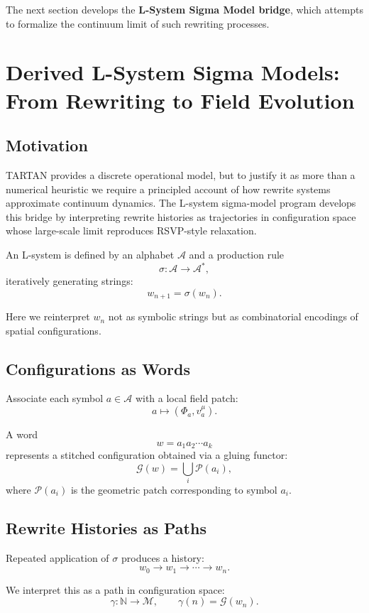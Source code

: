 \documentclass[12pt]{article}
\begin{document}
\bigskip

The next section develops the \textbf{L-System Sigma Model bridge}, which attempts to formalize the continuum limit of such rewriting processes.

\section{Derived L-System Sigma Models: From Rewriting to Field Evolution}

\subsection{Motivation}

TARTAN provides a discrete operational model, but to justify it as more than a numerical heuristic we require a principled account of how rewrite systems approximate continuum dynamics. The L-system sigma-model program develops this bridge by interpreting rewrite histories as trajectories in configuration space whose large-scale limit reproduces RSVP-style relaxation.

An L-system is defined by an alphabet $\mathcal{A}$ and a production rule
\[
\sigma : \mathcal{A} \to \mathcal{A}^\ast,
\]
iteratively generating strings:
\[
w_{n+1} = \sigma(w_n).
\]

Here we reinterpret $w_n$ not as symbolic strings but as combinatorial encodings of spatial configurations.

\subsection{Configurations as Words}

Associate each symbol $a \in \mathcal{A}$ with a local field patch:
\[
a \mapsto (\Phi_a, v_a^\mu).
\]

A word
\[
w = a_1 a_2 \cdots a_k
\]
represents a stitched configuration obtained via a gluing functor:
\[
\mathcal{G}(w) = \bigcup_i \mathcal{P}(a_i),
\]
where $\mathcal{P}(a_i)$ is the geometric patch corresponding to symbol $a_i$.

\subsection{Rewrite Histories as Paths}

Repeated application of $\sigma$ produces a history:
\[
w_0 \to w_1 \to \cdots \to w_n.
\]

We interpret this as a path in configuration space:
\[
\gamma : \mathbb{N} \to \mathcal{M}, \qquad \gamma(n)=\mathcal{G}(w_n).
\]
\end{document}
